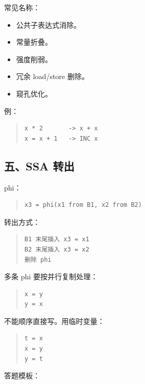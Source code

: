 \documentclass[UTF8,zihao=-4]{ctexart}
\begin{document}
常见名称：


\begin{itemize}
\item 公共子表达式消除。
\item 常量折叠。
\item 强度削弱。
\item 冗余 load/store 删除。
\item 窥孔优化。
\end{itemize}


例：


\begin{quote}
\footnotesize
\begin{verbatim}
x * 2       -> x + x
x = x + 1   -> INC x
\end{verbatim}
\end{quote}


\subsection{五、SSA 转出}


phi：


\begin{quote}
\footnotesize
\begin{verbatim}
x3 = phi(x1 from B1, x2 from B2)
\end{verbatim}
\end{quote}


转出方式：


\begin{quote}
\footnotesize
\begin{verbatim}
B1 末尾插入 x3 = x1
B2 末尾插入 x3 = x2
删除 phi
\end{verbatim}
\end{quote}


多条 phi 要按并行复制处理：


\begin{quote}
\footnotesize
\begin{verbatim}
x = y
y = x
\end{verbatim}
\end{quote}


不能顺序直接写。用临时变量：


\begin{quote}
\footnotesize
\begin{verbatim}
t = x
x = y
y = t
\end{verbatim}
\end{quote}


答题模板：
\end{document}
